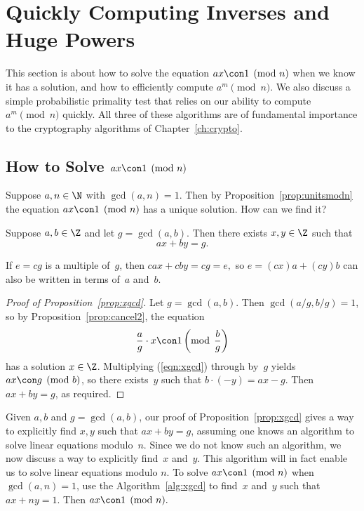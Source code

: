 \section{Quickly Computing Inverses and Huge Powers}
\label{sec:arith_mod_n}
This section is about how to solve the equation $ax\con 1\pmod{n}$
when we know it has a solution, and how to efficiently compute
$a^m\pmod{n}$.  We also discuss a simple probabilistic primality
test that relies on our ability to
compute $a^m\pmod{n}$ quickly.  All three of these algorithms are of
fundamental importance to the cryptography algorithms of
Chapter~\ref{ch:crypto}.


\subsection{How to Solve $ax\con 1\pmod{n}$}
Suppose $a, n\in\N$ with $\gcd(a,n)=1$.  Then
by Proposition~\ref{prop:unitsmodn}
the equation $ax\con 1\pmod{n}$ has a unique solution.
How can we find it?

\begin{proposition}
\label{prop:xgcd}
Suppose $a,b\in\Z$ and let $g=\gcd(a,b)$. Then
there exists $x,y\in\Z$ such that
$$
   ax + by = g.
$$
\end{proposition}
\begin{remark}
If $e=cg$ is a multiple of~$g$, then
$cax + cby = cg = e,$ so $e = (cx)a+(cy)b$ can
also be written in terms of~$a$ and~$b$.
\end{remark}

\begin{proof}[Proof of Proposition~\ref{prop:xgcd}]
  Let $g=\gcd(a,b)$.  Then
  $\gcd(a/g,b/g)=1$, so by Proposition~\ref{prop:cancel2},
 the equation
\begin{equation}\label{eqn:xgcd}
\frac{a}{g}\cdot x\con 1\left({\rm mod} \hspace{1ex}\frac{b}{g}\right)
\end{equation}
has a solution $x\in\Z$.  Multiplying (\ref{eqn:xgcd}) through by~$g$
yields $ax \con g \pmod{b}$, so there exists~$y$ such that
  $b\cdot (-y) = ax-g$.   Then $ax+by = g$, as required.
\end{proof}

Given $a,b$ and $g=\gcd(a,b)$, our proof of
Proposition~\ref{prop:xgcd} gives a way to explicitly find $x,y$ such
that $ax+by=g$, assuming one knows an algorithm to solve linear
equations modulo~$n$. Since we do not know such an algorithm, we now
discuss a way to explicitly find~$x$ and~$y$.  This algorithm
will in fact enable us to solve linear equations modulo $n$. To solve
$ax\con 1\pmod{n}$ when $\gcd(a,n)=1$, use the Algorithm~\ref{alg:xgcd} to
find~$x$ and~$y$ such that $ax+ny = 1$.  Then $ax\con 1\pmod{n}.$

